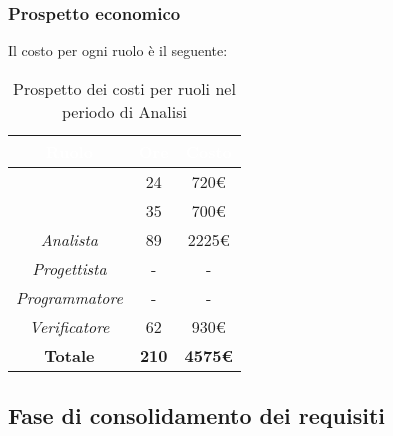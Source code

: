 \subsubsection{Prospetto economico}
Il costo per ogni ruolo è il seguente:
\begin{table}[H]
	\begin{center}
		\begin{tabular}{ |c c c| }
		\rowcolor{darkblue} 
		\textcolor{white}{\textbf{Ruolo}} & \textcolor{white}{\textbf{Ore}} & \textcolor{white}{\textbf{Costo}} \\ \hline
		\textit{\Responsabile} 	& 24 	& 720€ \\ \hline
		\textit{\Amministratore} 	& 35 	& 700€ \\ \hline
		\textit{Analista} 		& 89 	& 2225€ \\ \hline
		\textit{Progettista} 	& - 	& - \\ \hline
		\textit{Programmatore}  	& - 	& - \\ \hline
		\textit{Verificatore} 	& 62 	& 930€ \\ \hline
		\textbf{Totale} 		& \textbf{210} & \textbf{4575€} \\ \hline
		\end{tabular}
	\caption{ Prospetto dei costi per ruoli nel periodo di Analisi}
	\end{center}
\end{table}

\subsection{Fase di consolidamento dei requisiti}
